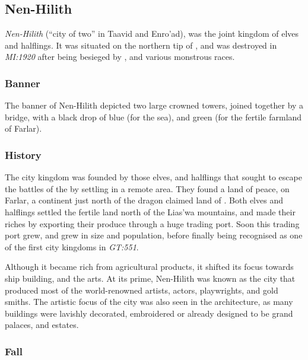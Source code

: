 \subsection{Nen-Hilith}
\label{sec:Nen-Hilith}

\emph{Nen-Hilith} (``city of two'' in Taavid and Enro'ad), was the joint
kingdom of elves and halflings. It was situated on the northern tip of
, and was destroyed in \emph{MI:1920} after being besieged
by , and various monstrous races.

\subsubsection{Banner}

The banner of Nen-Hilith depicted two large crowned towers, joined together
by a bridge, with a black drop of blue (for the sea), and green (for the
fertile farmland of Farlar).

\subsubsection{History}

The city kingdom was founded by those elves, and halflings that sought to
escape the battles of the  by settling in a remote area.
They found a land of peace, on Farlar, a continent just north of the dragon
claimed land of . Both elves and halflings settled
the fertile land north of the Lias'wa mountains, and made their riches by
exporting their produce through a huge trading port. Soon this trading port
grew, and grew in size and population, before finally being recognised as
one of the first city kingdoms in \emph{GT:551}.

Although it became rich from agricultural products, it shifted its focus
towards ship building, and the arts. At its prime, Nen-Hilith was known as the
city that produced most of the world-renowned artists, actors, playwrights,
and gold smiths. The artistic focus of the city was also seen in the
architecture, as many buildings were lavishly decorated, embroidered or
already designed to be grand palaces, and estates.

\subsubsection{Fall}

